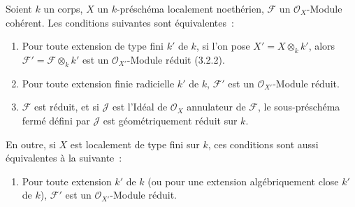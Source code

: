 \begin{proposition}[4.6.16]
\label{IV.2.4.6.16-fr}
Soient $k$ un corps, $X$ un $k$-préschéma localement noethérien, $\mathscr F$
un $\mathcal O_X$-Module cohérent. Les conditions suivantes sont
équivalentes~:
\begin{enumerate}
\item[a)] Pour toute extension de type fini $k'$ de $k$, si l'on pose
$X'=X\otimes_k k'$, alors $\mathscr F'=\mathscr F\otimes_k k'$ est un
$\mathcal O_{X'}$-Module réduit (3.2.2).
\item[b)] Pour toute extension finie radicielle $k'$ de $k$, $\mathscr F'$ est
un $\mathcal O_{X'}$-Module réduit.
\item[c)] $\mathscr F$ est réduit, et si $\mathscr J$ est l'Idéal de
$\mathcal O_X$ annulateur de $\mathscr F$, le sous-préschéma fermé défini par
$\mathscr J$ est géométriquement réduit sur $k$.
\end{enumerate}


En outre, si $X$ est localement de type fini sur $k$, ces conditions sont aussi
équivalentes à la suivante~:
\begin{enumerate}
\item[d)] Pour toute extension $k'$ de $k$ (ou pour une extension
algébriquement close $k'$ de $k$), $\mathscr F'$ est un
$\mathcal O_{X'}$-Module réduit.
\end{enumerate}
\end{proposition}

